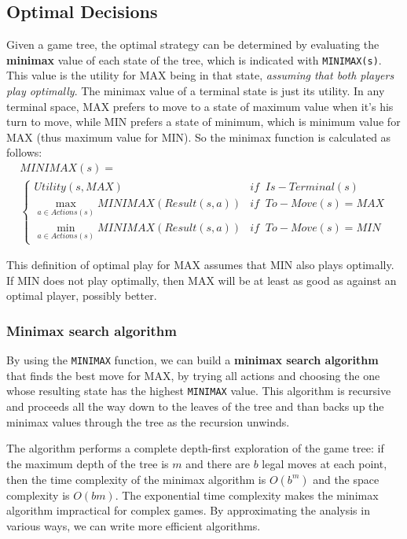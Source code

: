 \documentclass{article}
\begin{document}
\subsection{Optimal Decisions}
Given a game tree, the optimal strategy can be determined by evaluating the \textbf{minimax} value of each state of the tree, which is indicated with \lstinline{MINIMAX(s)}. This value is the utility for MAX being in that state, \textit{assuming that both players play optimally}. The minimax value of a terminal state is just its utility. In any terminal space, MAX prefers to move to a state of maximum value when it's his turn to move, while MIN prefers a state of minimum, which is minimum value for MAX (thus maximum value for MIN). So the minimax function is calculated as follows:
\begin{multline}
    MINIMAX(s) = \\
    \begin{cases}
        Utility(s, MAX) & if \;\; Is-Terminal(s) \\
        \max_{a\in Actions(s)} MINIMAX(Result(s, a)) & if \;\; To-Move(s) = MAX \\
        \min_{a \in Actions(s)} MINIMAX(Result(s, a)) & if \;\; To-Move(s) = MIN        
    \end{cases}
\end{multline}

This definition of optimal play for MAX assumes that MIN also plays optimally. If MIN does not play optimally, then MAX will be at least as good as against an optimal player, possibly better.

\subsubsection{Minimax search algorithm}
By using the \lstinline{MINIMAX} function, we can build a \textbf{minimax search algorithm} that finds the best move for MAX, by trying all actions and choosing the one whose resulting state has the highest \lstinline{MINIMAX} value. This algorithm is recursive and proceeds all the way down to the leaves of the tree and than backs up the minimax values through the tree as the recursion unwinds.

The algorithm performs a complete depth-first exploration of the game tree: if the maximum depth of the tree is \(m\) and there are \(b\) legal moves at each point, then the time complexity of the minimax algorithm is \(O(b^m)\) and the space complexity is \(O(bm)\). The exponential time complexity makes the minimax algorithm impractical for complex games. By approximating the analysis in various ways, we can write more efficient algorithms.
\end{document}
